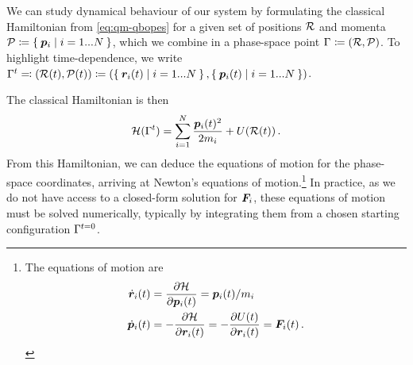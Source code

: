 We can study dynamical behaviour of our system by formulating the classical Hamiltonian from \cref{eq:qm-qbopes} for a given set of positions $\mathcal{R}$ and momenta $\mathcal{P} \coloneqq \Set{\boldsymbol{p}_i | i=1...N}$, which we combine in a phase-space point $\Gamma_{}^{} \coloneqq (\mathcal{R}, \mathcal{P})$.
To highlight time-dependence, we write\\
$\Gamma_{}^{t} \eqqcolon (\mathcal{R}(t), \mathcal{P}(t)) \coloneqq (\Set{\boldsymbol{r}_i(t) | i=1...N}, \Set{\boldsymbol{p}_i(t) | i=1...N}) $.

The classical Hamiltonian is then
\begin{equation}
	\Hamiltonian(\phasp{}{t}) = \sum_{i=1}^{N} \frac{\momentum_i(t)^2}{2 m_i} + U(\Rgen(t)) \, . \label{eq:md-H}
\end{equation}
From this Hamiltonian, we can deduce the equations of motion for the phase-space coordinates, arriving at Newton's equations of motion.\footnote[][-4\baselineskip]{The equations of motion are
	\begin{align*}
		\dot \R_i(t) &= \frac{\partial \Hamiltonian}{\partial \momentum_i(t)} = \momentum_i(t) / m_i \\
		\dot \momentum_i(t) &= -\frac{\partial \Hamiltonian}{\partial \R_i(t)} = -\frac{\partial U(t)}{\partial \R_i(t)} = \F_i(t) \, . \label{eq:md-eom}
	\end{align*}
} In practice, as we do not have access to a closed-form solution for $\boldsymbol{F}_i$, these equations of motion must be solved numerically, typically by integrating them from a chosen starting configuration $\Gamma_{}^{t=0}$. 

